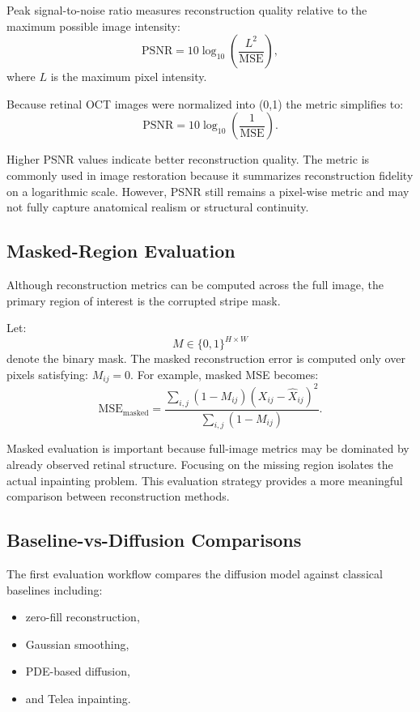 \documentclass[12pt,oneside]{article}
\begin{document}
Peak signal-to-noise ratio measures reconstruction quality relative to the maximum possible image intensity:
\[
\mathrm{PSNR}
=
10
\log_{10}
\left(
\frac{L^2}{\mathrm{MSE}}
\right),
\]
where $L$ is the maximum pixel intensity.

Because retinal OCT images were normalized into (0,1) the metric simplifies to:
\[
\mathrm{PSNR}
=
10
\log_{10}
\left(
\frac{1}{\mathrm{MSE}}
\right).
\]

Higher PSNR values indicate better reconstruction quality. The metric is commonly used in image restoration because it summarizes reconstruction fidelity on a logarithmic scale.
However, PSNR still remains a pixel-wise metric and may not fully capture anatomical realism or structural continuity.

\subsection*{Masked-Region Evaluation}

Although reconstruction metrics can be computed across the full image, the primary region of interest is the corrupted stripe mask.

Let:
\[
M
\in
\{0,1\}^{H \times W}
\]
denote the binary mask. The masked reconstruction error is computed only over pixels satisfying:
\(
M_{ij}=0.
\)
For example, masked MSE becomes:
\[
\mathrm{MSE}_{\mathrm{masked}}
=
\frac{
\sum_{i,j}
(1-M_{ij})
(X_{ij}-\hat{X}_{ij})^2
}{
\sum_{i,j}(1-M_{ij})
}.
\]

Masked evaluation is important because full-image metrics may be dominated by already observed retinal structure. Focusing on the missing region isolates the actual inpainting problem.
This evaluation strategy provides a more meaningful comparison between reconstruction methods.

\subsection*{Baseline-vs-Diffusion Comparisons}

The first evaluation workflow compares the diffusion model against classical baselines including:
\begin{itemize}
    \item zero-fill reconstruction,
    \item Gaussian smoothing,
    \item PDE-based diffusion,
    \item and Telea inpainting.
\end{itemize}
\end{document}

